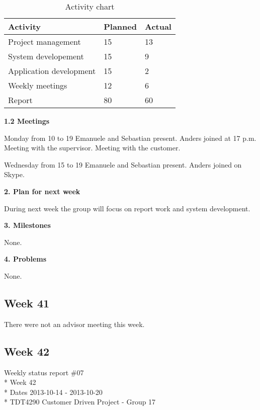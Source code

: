\begin{table}[H]
\begin{center}
\begin{tabular}{ l | l | l }
  \hline
  Activity & Planned & Actual \\
  \hline\noalign{\smallskip}\noalign{\smallskip}\hline
  Project management & 15 & 13 \\
  System developement & 15 & 9 \\
  Application development & 15 & 2 \\
  Weekly meetings & 12 & 6 \\
  Report & 80 & 60 \\
  \hline
\end{tabular}
\end{center}
\caption{Activity chart}
\label{table:activityChartStatusReportWeek40}
\end{table}

\textbf{1.2 Meetings}

Monday from 10 to 19
Emanuele and Sebastian present. Anders joined at 17 p.m.
Meeting with the supervisor. Meeting with the customer.

Wednesday from 15 to 19
Emanuele and Sebastian present. Anders joined on Skype.

\textbf{2. Plan for next week}

During next week the group will focus on report work and system development.

\textbf{3. Milestones}

None.

\textbf{4. Problems}

None.

\newpage
\subsection{Week 41}

There were not an advisor meeting this week. 

\newpage
\subsection{Week 42}

\begin{center}
Weekly status report \#07\\*
Week 42 \\*
Dates 2013-10-14 - 2013-10-20 \\*
TDT4290 Customer Driven Project - Group 17
\end{center}

